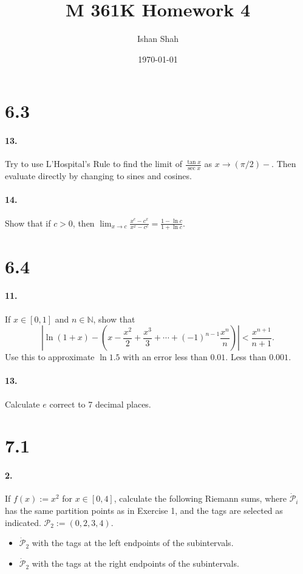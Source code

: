 \documentclass[12pt]{article}
\theoremstyle{remark}
\begin{document}
\title{M 361K Homework 4}
\author{Ishan Shah}
\date{\today}
\maketitle

\section*{6.3}
\paragraph{13.} Try to use L'Hospital's Rule to find the limit of $\frac{\tan x}{\sec x}$ as $x \rightarrow(\pi / 2)-$. Then evaluate directly by changing to sines and cosines.

\paragraph{14.} Show that if $c>0$, then $\lim _{x \rightarrow c} \frac{x^c-c^x}{x^x-c^c}=\frac{1-\ln c}{1+\ln c}$.

\section*{6.4}
\paragraph{11.} If $x \in[0,1]$ and $n \in \mathbb{N}$, show that
$$
\left|\ln (1+x)-\left(x-\frac{x^2}{2}+\frac{x^3}{3}+\cdots+(-1)^{n-1} \frac{x^n}{n}\right)\right|<\frac{x^{n+1}}{n+1} .
$$
Use this to approximate $\ln 1.5$ with an error less than $0.01$. Less than $0.001$.

\paragraph{13.} Calculate $e$ correct to 7 decimal places.

\section*{7.1}
\paragraph{2.} If $f(x):=x^2$ for $x \in[0,4]$, calculate the following Riemann sums, where $\dot{\mathcal{P}}_i$ has the same partition points as in Exercise 1, and the tags are selected as indicated. $\mathcal{P}_2 := (0, 2, 3, 4)$.
\begin{itemize}
    \item $\dot{\mathcal{P}}_2$ with the tags at the left endpoints of the subintervals.
    \item $\dot{\mathcal{P}}_2$ with the tags at the right endpoints of the subintervals.
\end{itemize}
\end{document}
